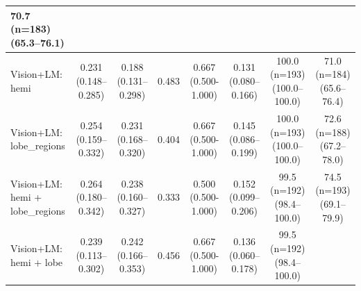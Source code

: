 \documentclass[FCD_GNN.tex]{subfiles}
\begin{document}
\begin{table}[ht]
\begin{threeparttable}
\begin{tabular}{lccccccc}
    \makecell{70.7 (n=183) \\ (65.3--76.1)} \\
    \hline
    Vision+LM: hemi &
    \makecell{0.231\\(0.148--0.285)} &
    \makecell{0.188\\(0.131--0.298)} &
    \colorbox{cyan!15}{0.483} &
    \makecell{0.667 \\ (0.500-1.000)} &
    \makecell{0.131\\(0.080--0.166)} &
    \makecell{\colorbox{green!15}{100.0 (n=193)} \\ (100.0--100.0)} &
    \makecell{71.0 (n=184) \\ (65.6--76.4)} \\
    \hline
    Vision+LM: lobe\_regions &
    \makecell{\colorbox{orange!15}{0.254}\\(0.159--0.332)} &
    \makecell{0.231\\(0.168--0.320)} &
    0.404 &
    \makecell{0.667 \\ (0.500-1.000)} &
    \makecell{\colorbox{orange!15}{0.145}\\(0.086--0.199)} &
    \makecell{\colorbox{green!15}{100.0 (n=193)} \\ (100.0--100.0)} &
    \makecell{\colorbox{orange!15}{72.6 (n=188)} \\ (67.2--78.0)} \\
    \hline
    Vision+LM: \makecell{hemi +\\ lobe\_regions} &
    \makecell{\colorbox{green!15}{0.264}\\(0.180--0.342)} &
    \makecell{\colorbox{orange!15}{0.238}\\(0.160--0.327)} &
    0.333 &
    \makecell{0.500 \\ (0.500-1.000)} &
    \makecell{\colorbox{green!15}{0.152}\\(0.099--0.206)} &
    \makecell{\colorbox{cyan!15}{99.5 (n=192)} \\ (98.4--100.0)} & 
    \makecell{\colorbox{cyan!15}{74.5 (n=193)} \\ (69.1--79.9) } \\
    \hline
    Vision+LM: hemi + lobe &
    \makecell{0.239\\(0.113--0.302)} &
    \makecell{\colorbox{cyan!15}{0.242}\\(0.166--0.353)} &
    0.456 &
    \makecell{0.667 \\ (0.500-1.000)} &
    \makecell{0.136\\(0.060--0.178)} &
    \makecell{\colorbox{cyan!15}{99.5 (n=192)} \\ (98.4--100.0)} & 

\end{tabular}
\end{threeparttable}
\end{table}
\end{document}

